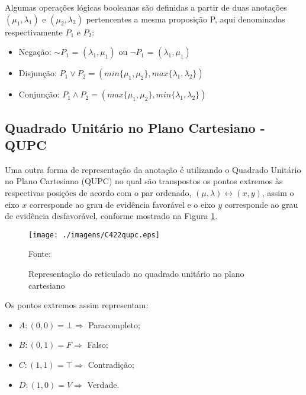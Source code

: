 Algumas operações lógicas booleanas são definidas 
\cite{JISFeAS} \cite{Abe2014}
a partir de duas anotações 
$(\mu _1, \lambda _1)$ e $(\mu _2, \lambda _2)$ 
pertencentes a mesma proposição P, 
aqui denominadas respectivamente $P_1$ e $P_2$:

\begin{itemize}

\item Negação: $\sim$$P _1$ = $(\lambda _1, \mu _1)$ ou 
$\neg$$P _1$ = $(\lambda _1, \mu _1)$

\item Disjunção: $P _1 \vee P _2 = 
(min\{\mu _1, \mu _2\},max\{\lambda _1, \lambda _2\})$ 

\item Conjunção: $P _1 \wedge P _2 = 
(max\{\mu _1, \mu _2\},min\{\lambda _1, \lambda _2\})$ 


\end{itemize}




\subsection{Quadrado Unitário no Plano Cartesiano - QUPC}

Uma outra forma de representação da anotação é utilizando o Quadrado Unitário no Plano Cartesiano (QUPC) no qual são transpostos os pontos extremos às respectivas posições de acordo com o par ordenado,  $(\mu, \lambda ) \leftrightarrow (x,y) $, assim o eixo $x$ corresponde ao grau de evidência favorável e o eixo $y$ corresponde ao grau de evidência desfavorável, conforme mostrado na Figura \ref{fig:reticuladoQUPC}.



\begin{figure}[!htb]
\caption{Representação do reticulado no quadrado unitário no plano cartesiano}
\center\texttt{[image: ./imagens/C422qupc.eps]}
\label{fig:reticuladoQUPC}

{\small Fonte: \cite{JoaoInacio} }
\end{figure}

Os pontos extremos assim representam:

\begin{itemize}
\item $A: (0,0) = \bot \Rightarrow $ Paracompleto;
\item $B: (0,1) = F \Rightarrow $ Falso;
\item $C: (1,1) = \top \Rightarrow $ Contradição;
\item $D: (1,0) = V \Rightarrow $ Verdade.
\end{itemize}


